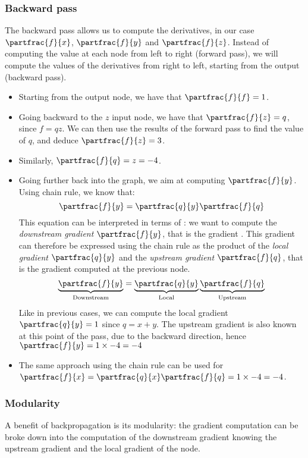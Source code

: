 \subsubsection{Backward pass}
The backward pass allows us to compute the derivatives, in our case $\partfrac{f}{x}$, $\partfrac{f}{y}$ and $\partfrac{f}{z}$. Instead of computing the value at each node from left to right (forward pass), we will compute the values of the derivatives from right to left, starting from the output (backward pass).

\begin{itemize}
    \item Starting from the output node, we have that $\partfrac{f}{f}=1$.
    \item Going backward to the $z$ input node, we have that $\partfrac{f}{z}=q$, since $f=qz$. We can then use the results of the forward pass to find the value of $q$, and deduce $\partfrac{f}{z}=3$.
    \item Similarly, $\partfrac{f}{q}=z=-4$.
    \item Going further back into the graph, we aim at computing $\partfrac{f}{y}$. Using chain rule, we know that:
    \begin{equation*}
        \partfrac{f}{y}=\partfrac{q}{y}\partfrac{f}{q}
    \end{equation*}
    This equation can be interpreted in terms of : we want to compute the \emph{downstream gradient} $\partfrac{f}{y}$, that is the gradient . This gradient can therefore be expressed using the chain rule as the product of the \emph{local gradient} $\partfrac{q}{y}$ and the \emph{upstream gradient} $\partfrac{f}{q}$, that is the gradient computed at the previous node.
    \begin{equation*}
        \underbrace{\partfrac{f}{y}}_{\textnormal{Downstream}}=\underbrace{\partfrac{q}{y}}_{\textnormal{Local}} \underbrace{\partfrac{f}{q}}_{\textnormal{Upstream}}
    \end{equation*}
    Like in previous cases, we can compute the local gradient $\partfrac{q}{y}=1$ since $q=x+y$. The upstream gradient is also known at this point of the pass, due to the backward direction, hence $\partfrac{f}{y}=1\times-4=-4$
    \item The same approach using the chain rule can be used for $\partfrac{f}{x}=\partfrac{q}{x}\partfrac{f}{q}=1\times -4=-4$.
\end{itemize}

\subsubsection{Modularity}
A benefit of backpropagation is its modularity: the gradient computation can be broke down into the computation of the downstream gradient knowing the upstream gradient and the local gradient of the node. 

